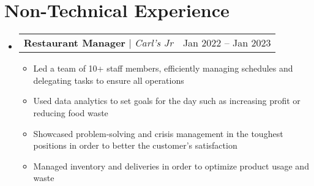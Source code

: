 \documentclass[letterpaper,11pt]{article}
\makeatletter
\newcommand{\resumeItem}[1]{
  \item\small{
    {#1 \vspace{-2pt}}
  }
}
\newcommand{\resumeProjectHeading}[2]{
    \item
    \begin{tabular*}{0.97\textwidth}{l@{\extracolsep{\fill}}r}
      \small#1 & #2 \\
    \end{tabular*}\vspace{-7pt}
}
\newcommand{\resumeSubHeadingListStart}{\begin{itemize}[leftmargin=0.15in, label={}]}
\newcommand{\resumeSubHeadingListEnd}{\end{itemize}}
\newcommand{\resumeItemListStart}{\begin{itemize}}
\newcommand{\resumeItemListEnd}{\end{itemize}\vspace{-5pt}}
\makeatother
\begin{document}

\section{Non-Technical Experience}
    \vspace{2pt}
    \resumeSubHeadingListStart
        \resumeProjectHeading
            {\textbf{Restaurant Manager} $|$ \emph{Carl's Jr}}{Jan 2022 -- Jan 2023}
            \resumeItemListStart
                \resumeItem{Led a team of 10+ staff members, efficiently managing schedules and delegating tasks to ensure all operations}
                \resumeItem{Used data analytics to set goals for the day such as increasing profit or reducing food waste}
                \resumeItem{Showcased problem-solving and crisis management in the toughest positions in order to better the customer's satisfaction}
                \resumeItem{Managed inventory and deliveries in order to optimize product usage and waste}
            \resumeItemListEnd
    \resumeSubHeadingListEnd
\end{document}
